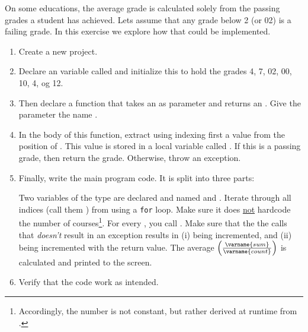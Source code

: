 On some educations, the average grade is calculated solely from the passing grades a student has achieved. Lets assume that any grade below 2 (or 02) is a failing grade. In this exercise we explore how that could be implemented.

\begin{enumerate}
  \item Create a new project.
  \item Declare an  variable called  and initialize this to hold the grades 4, 7, 02, 00, 10, 4, og 12.
  \item Then declare a  function that takes an  as parameter and returns an . Give the parameter the name .
  \item In the body of this function, extract using indexing first a value from the  position of . This value is stored in a local  variable called . If this is a passing grade, then return the grade. Otherwise, throw an exception.
  \item Finally, write the main program code. It is split into three parts:
    \begin{enumerate}
       Two variables of the type  are declared and named  and .
      Iterate through all indices (call them ) from  using a \texttt{for} loop. Make sure it does \underline{not} hardcode the number of courses\footnote{Accordingly, the number is not constant, but rather derived at runtime from .}. For every , you call . Make sure that the the calls that \textsl{doesn't} result in an exception results in (i)  being incremented, and (ii)  being incremented with the return value.
       The average $\left(\frac{\varname{sum}}{\varname{count}}\right)$ is calculated and printed to the screen.
    \end{enumerate}
  \item Verify that the code work as intended.
\end{enumerate}

